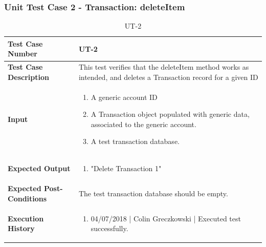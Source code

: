 \documentclass[12pt]{article}
\begin{document}
\subsubsection{Unit Test Case 2 - Transaction: deleteItem}
\def\arraystretch{1.5}%
\begin{table}[htbp]
\centering
\caption {UT-2}
\label{UT-2}
\begin{tabularx}{\textwidth}{ | l | X |}
\hline
\textbf{Test Case Number}      &  UT-2                         \\ \hline
\textbf{Test Case Description}    &  This test verifies that the deleteItem method works as intended, and deletes a Transaction record for a given ID                \\ \hline
\textbf{Input}         & 	\begin{enumerate}
          \item A generic account ID
	\item A Transaction object populated with generic data, associated to the generic account.
	\item A test transaction database.
\end{enumerate} \\ \hline

\textbf{Expected Output}     & \begin{enumerate}
	\item "Delete Transaction 1"
\end{enumerate} \\ \hline
\textbf{Expected Post-Conditions}           & The test transaction database should be empty.                \\ \hline
\textbf{Execution History}   &  \begin{enumerate}
	\item 04/07/2018 | Colin Greczkowski | Executed test successfully.
\end {enumerate} \\ \hline
\end{tabularx}
\end{table}
\clearpage

\end{document}
